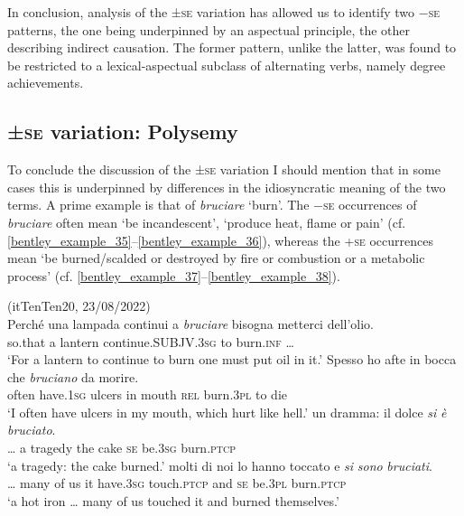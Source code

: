 \documentclass[output=paper,colorlinks,citecolor=brown
]{langscibook}
\begin{document}
In conclusion, analysis of the ±\textsc{se} variation has allowed us to identify two −\textsc{se} patterns, the one being underpinned by an aspectual principle, the other describing indirect causation. The former pattern, unlike the latter, was found to be restricted to a lexical-aspectual subclass of alternating verbs, namely degree achievements.

\subsection{±\textsc{se} variation: Polysemy}
\label{bentley_section_4.3}

To conclude the discussion of the ±\textsc{se} variation I should mention that in some cases this is underpinned by differences in the idiosyncratic meaning of the two terms. A prime example is that of \textit{bruciare} ‘burn’. The −\textsc{se} occurrences of \textit{bruciare} often mean ‘be incandescent’, ‘produce heat, flame or pain’ (cf. \ref{bentley_example_35}--\ref{bentley_example_36}), whereas the +\textsc{se} occurrences mean ‘be burned/scalded or destroyed by fire or combustion or a metabolic process’ (cf. \ref{bentley_example_37}--\ref{bentley_example_38}).

\ea \label{bentley_example_35}(itTenTen20, 23/08/2022)\\
    \gll Perché		una	lampada	continui											a 	\textit{bruciare} {bisogna metterci dell’olio.} \\
    	so.that		a				lantern			continue.SUBJV.3\textsc{sg}	to	burn.\textsc{inf} {\ldots} \\
    \glt 				‘For a lantern to continue to burn one must put oil in it.’
\ex \label{bentley_example_36}
    \gll Spesso		ho						afte			in	bocca		che		\textit{bruciano}	da	morire. \\
    	often			have.1\textsc{sg}	ulcers	in	mouth	\textsc{rel}	burn.3\textsc{pl}		to		die \\
    \glt 				‘I often have ulcers in my mouth, which hurt like hell.’
\ex \label{bentley_example_37}
    \gll  {\ldots}  un dramma: il		dolce \textit{si} \textit{	è }					\textit{bruciato}. \\
    	{\ldots} a			tragedy		the	cake		\textsc{se}		be.3\textsc{sg}	burn.\textsc{ptcp} \\
    \glt 	‘a tragedy: the cake burned.’
\ex \label{bentley_example_38}
     molti di		noi	lo	hanno			toccato				e				\textit{si}	\textit{sono}			\textit{bruciati}. \\
    	{\ldots} many	of		us		it	have.3\textsc{sg}	touch.\textsc{ptcp}		and	\textsc{se}	be.3\textsc{pl}		burn.\textsc{ptcp} \\
    \glt ‘a hot iron  \ldots{}  many of us touched it and burned themselves.’	
\z
\end{document}
